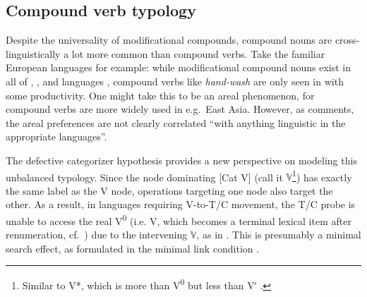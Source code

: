 \documentclass[output=paper]{langsci/langscibook}
\begin{document}
\subsection{Compound verb typology}\label{sec5.3}

Despite the universality of modificational compounds, compound nouns are\linebreak
cross-linguistically a lot more common than compound verbs. Take the familiar
Eu\-ro\-pean languages for example: while modificational compound nouns exist
in all of , , and  languages \citep[cf.][]{Bauer2009},
compound verbs like {\it hand-wash} are only seen in  with some
productivity. One might take this to be an areal phenomenon, for compound verbs
are more widely used in e.g.\ East Asia. However, as \citet[355]{Bauer2009}
comments, the areal preferences are not clearly correlated ``with anything
linguistic in the appropriate languages''.

The defective categorizer hypothesis provides a new perspective on modeling
this unbalanced typology. Since the node dominating
[Cat\textsubscript{\textsurd} V\textsubscript{\textsurd}] (call it
$\mathbb{V}$\footnote{Similar to  V*, which is more than
V\textsuperscript{0} but less than Vʹ \citep[cf.][]{Vikner2005}.}) has exactly
the same label as the V\textsubscript{\textsurd} node, operations targeting one
node also target the other. As a result, in languages requiring V-to-T/C
movement, the T/C probe is unable to access the real V\textsuperscript{0} (i.e.
V\textsubscript{\textsurd}, which becomes a terminal lexical item after
renumeration, cf.\ ) due to the intervening $\mathbb{V}$, as in
. This is presumably a minimal search effect, as formulated in the
minimal link condition .
\end{document}
